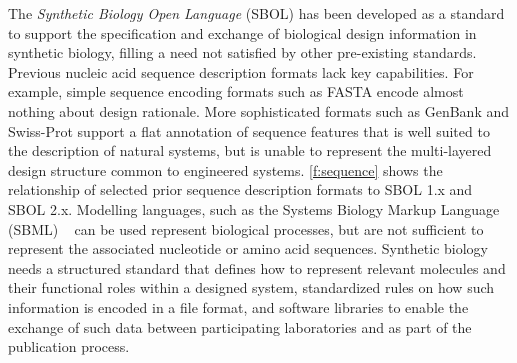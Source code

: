 The \emph{Synthetic Biology Open Language} (SBOL) has been developed as a standard to support the specification and exchange of biological design information in synthetic biology, filling a need not satisfied by other pre-existing standards.
Previous nucleic acid sequence description formats lack key capabilities. For example,  simple sequence encoding formats such as FASTA encode almost nothing about design rationale. More sophisticated formats such as GenBank and Swiss-Prot support a flat annotation of sequence features that is well suited to the  description of natural systems, but is unable to represent the multi-layered design structure common to engineered systems.
\ref{f:sequence} shows the relationship of selected prior sequence description formats to SBOL 1.x and SBOL 2.x.
Modelling languages, such as the Systems Biology Markup Language (SBML) ~\cite{SBML} can be used represent biological processes, but are not sufficient to represent the associated nucleotide or amino acid sequences.  %
Synthetic biology needs a structured standard that defines how to represent relevant molecules and their functional roles within a designed system, standardized rules on how such information is encoded in a file format, and software libraries to enable the exchange of such data between participating laboratories and as part of the publication process. 

